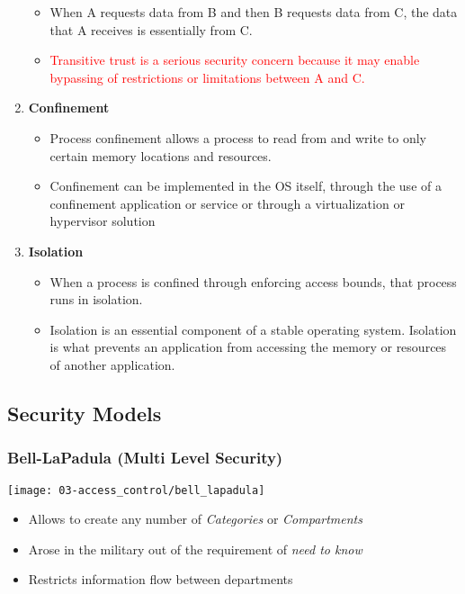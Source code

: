 \begin{enumerate}
    \begin{itemize}
        \item When A requests data from B and then B requests data from C, the data that A receives is essentially from C.
        \item \textcolor{red}{Transitive trust is a serious security concern because it may enable bypassing of restrictions or limitations between A and C.}
    \end{itemize}
    \item \textbf{Confinement}
    \begin{itemize}
        \item Process confinement allows a process to read from and write to only certain memory locations and resources.
        \item Confinement can be implemented in the OS itself, through the use of a confinement application or service or through a virtualization or hypervisor solution
    \end{itemize}
    \item \textbf{Isolation}
    \begin{itemize}
        \item When a process is confined through enforcing access bounds, that process runs in isolation.
        \item Isolation is an essential component of a stable operating system. Isolation is what prevents an application from accessing the memory or resources of another application.
    \end{itemize}
\end{enumerate}

\subsection{Security Models}

\subsubsection{Bell-LaPadula (Multi Level Security)}
\texttt{[image: 03-access\_control/bell\_lapadula]}
\begin{itemize}
    \item Allows to create any number of \textit{Categories} or \textit{Compartments}
    \item Arose in the military out of the requirement of \textit{need to know}
    \item Restricts information flow between departments
\end{itemize}

